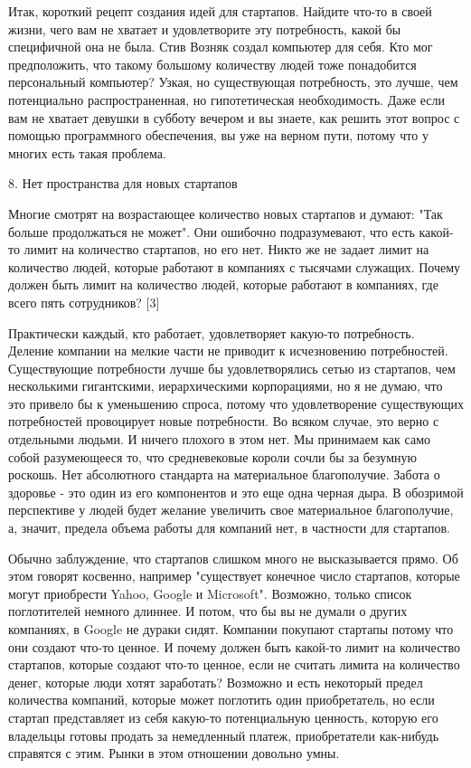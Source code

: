 \documentclass[ebook,12pt,oneside,openany]{memoir}
\begin{document}
Итак, короткий рецепт создания идей для стартапов. Найдите что-то в
своей жизни, чего вам не хватает и удовлетворите эту потребность,
какой бы специфичной она не была. Стив Возняк создал компьютер для
себя. Кто мог предположить, что такому большому количеству людей тоже
понадобится персональный компьютер? Узкая, но существующая
потребность, это лучше, чем потенциально распространенная, но
гипотетическая необходимость. Даже если вам не хватает девушки в
субботу вечером и вы знаете, как решить этот вопрос с помощью
программного обеспечения, вы уже на верном пути, потому что у многих
есть такая проблема.

8. Нет пространства для новых стартапов

Многие смотрят на возрастающее количество новых стартапов и думают:
"Так больше продолжаться не может". Они ошибочно подразумевают, что
есть какой-то лимит на количество стартапов, но его нет. Никто же не
задает лимит на количество людей, которые работают в компаниях с
тысячами служащих. Почему должен быть лимит на количество людей,
которые работают в компаниях, где всего пять сотрудников? [3]

Практически каждый, кто работает, удовлетворяет какую-то потребность.
Деление компании на мелкие части не приводит к исчезновению
потребностей. Существующие потребности лучше бы удовлетворялись сетью
из стартапов, чем несколькими гигантскими, иерархическими
корпорациями, но я не думаю, что это привело бы к уменьшению спроса,
потому что удовлетворение существующих потребностей провоцирует новые
потребности. Во всяком случае, это верно с отдельными людьми. И ничего
плохого в этом нет. Мы принимаем как само собой разумеющееся то, что
средневековые короли сочли бы за безумную роскошь. Нет абсолютного
стандарта на материальное благополучие. Забота о здоровье - это один
из его компонентов и это еще одна черная дыра. В обозримой перспективе
у людей будет желание увеличить свое материальное благополучие, а,
значит, предела объема работы для компаний нет, в частности для
стартапов.

Обычно заблуждение, что стартапов слишком много не высказывается
прямо. Об этом говорят косвенно, например "существует конечное число
стартапов, которые могут приобрести Yahoo, Google и Microsoft".
Возможно, только список поглотителей немного длиннее. И потом, что бы
вы не думали о других компаниях, в Google не дураки сидят. Компании
покупают стартапы потому что они создают что-то ценное. И почему
должен быть какой-то лимит на количество стартапов, которые создают
что-то ценное, если не считать лимита на количество денег, которые
люди хотят заработать? Возможно и есть некоторый предел количества
компаний, которые может поглотить один приобретатель, но если стартап
представляет из себя какую-то потенциальную ценность, которую его
владельцы готовы продать за немедленный платеж, приобретатели
как-нибудь справятся с этим. Рынки в этом отношении довольно умны.
\end{document}

